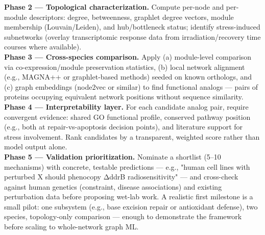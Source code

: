 \documentclass{article}
\begin{document}
\textbf{Phase 2 — Topological characterization.} Compute per-node and per-module descriptors: degree, betweenness, graphlet degree vectors, module membership (Louvain/Leiden), and hub/bottleneck status; identify stress-induced subnetworks (overlay transcriptomic response data from irradiation/recovery time courses where available).\\
\textbf{Phase 3 — Cross-species comparison.} Apply (a) module-level comparison via co-expression/module preservation statistics, (b) local network alignment (e.g., MAGNA++ or graphlet-based methods) seeded on known orthologs, and (c) graph embeddings (node2vec or similar) to find functional analogs — pairs of proteins occupying equivalent network positions without sequence similarity.\\
\textbf{Phase 4 — Interpretability layer. }For each candidate analog pair, require convergent evidence: shared GO functional profile, conserved pathway position (e.g., both at repair-vs-apoptosis decision points), and literature support for stress involvement. Rank candidates by a transparent, weighted score rather than model output alone. \\
\textbf{Phase 5 — Validation prioritization.} Nominate a shortlist (5–10 mechanisms) with concrete, testable predictions — e.g., "human cell lines with perturbed X should phenocopy ΔddrB radiosensitivity" — and cross-check against human genetics (constraint, disease associations) and existing perturbation data before proposing wet-lab work.
A realistic first milestone is a small pilot: one subsystem (e.g., base excision repair or antioxidant defense), two species, topology-only comparison — enough to demonstrate the framework before scaling to whole-network graph ML.
\end{document}
